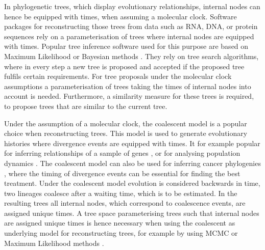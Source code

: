 \documentclass[11pt]{amsart}
\newcommand{\summary}[1]{} %
\begin{document}
\summary{Software needs to deal with clock trees, tree proposals}
In phylogenetic trees, which display evolutionary relationships, internal nodes can hence be equipped with times, when assuming a molecular clock.
Software packages for reconstructing those trees from data such as RNA, DNA, or protein sequences rely on a parameterisation of trees where internal nodes are equipped with times.
Popular tree inference software used for this purpose are based on Maximum Likelihood \autocite{Kozlov2019-cf, Nguyen2015-sp, Tamura2011-ky} or Bayesian methods \autocite{Bouckaert2014-ir,Suchard2018-tw, Ronquist2003-eq}.
They rely on tree search algorithms, where in every step a new tree is proposed and accepted if the proposed tree fulfils certain requirements.
For tree proposals under the molecular clock assumptions a parameterisation of trees taking the times of internal nodes into account is needed.
Furthermore, a similarity measure for these trees is required, to propose trees that are similar to the current tree.

\summary{Coalescent as a popular class of evolutionary generating models}
Under the assumption of a molecular clock, the coalescent model is a popular choice when reconstructing trees.
This model is used to generate evolutionary histories \autocite{Kingman1982-df} where divergence events are equipped with times.
It for example popular for inferring relationships of a sample of genes \autocite{Hudson1990-ki, Kuhner2009-jb}, or for analysing population dynamics \autocite{Kuhner1998-eh,Drummond2005-ak}.
The coalescent model can also be used for inferring cancer phylogenies \autocite{Posada2020-aa, Ohtsuki2017-su}, where the timing of divergence events can be essential for finding the best treatment.
Under the coalescent model evolution is considered backwards in time, two lineages coalesce after a waiting time, which is to be estimated.
In the resulting trees all internal nodes, which correspond to coalescence events, are assigned unique times.
A tree space parameterising trees such that internal nodes are assigned unique times is hence necessary when using the coalescent as underlying model for reconstructing trees, for example by using MCMC \autocite{Bouckaert2014-ir,Suchard2018-tw} or Maximum Likelihood methods \autocite{Kozlov2019-cf, Nguyen2015-sp}.
\end{document}
